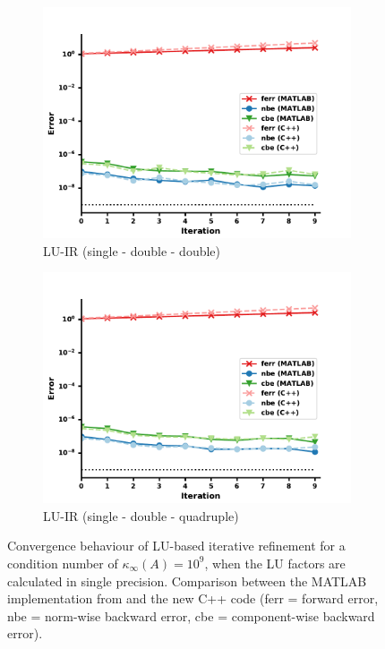 \begin{figure}
\centering
\begin{subfigure}{.5\textwidth}
  \centering
  \includegraphics[width=\linewidth]{chapters/5_experiments/figures/LUsdd.pdf}
  \caption{LU-IR (single - double - double)}
  \label{fig:lusdd}
\end{subfigure}%
\begin{subfigure}{.5\textwidth}
  \centering
  \includegraphics[width=\linewidth]{chapters/5_experiments/figures/LUsdq.pdf}
  \caption{LU-IR (single - double - quadruple)}
  \label{fig:lusdq}
\end{subfigure}
\caption[LU-based IR (single precision factorization)]{Convergence behaviour of LU-based iterative refinement for a condition number of $\kappa_\infty (A)=10^9$, when the LU factors are calculated in single precision. Comparison between the MATLAB implementation from \cite{carson_new_2017} and the new C++ code (ferr = forward error, nbe = norm-wise backward error, cbe = component-wise backward error).}
\label{fig:lu_ir3}
\end{figure}

